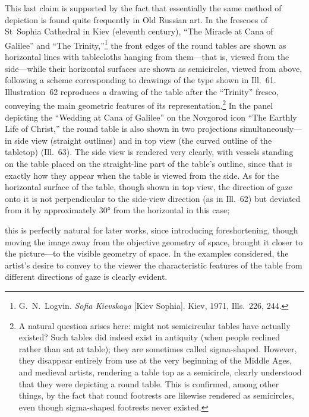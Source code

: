 This last claim is supported by the fact that essentially the same method of depiction
is found quite frequently in Old Russian art.  In the frescoes of St~Sophia Cathedral
in Kiev (eleventh century), ``The Miracle at Cana of Galilee'' and
``The Trinity,''\footnote{G.~N.~Logvin.  \emph{Sofia Kievskaya} [Kiev Sophia].
  Kiev, 1971, Ills.~226, 244.} the front edges of the round tables are shown as
horizontal lines with tablecloths hanging from them---that is, viewed from the side---while
their horizontal surfaces are shown as semicircles, viewed from above, following a scheme
corresponding to drawings of the type shown in Ill.~61.  Illustration~62 reproduces a
drawing of the table after the ``Trinity'' fresco, conveying the main geometric features
of its representation.\footnote{A natural question arises here: might not semicircular
  tables have actually existed?  Such tables did indeed exist in antiquity (when people
  reclined rather than sat at table); they are sometimes called sigma-shaped.  However,
  they disappear entirely from use at the very beginning of the Middle Ages, and medieval
  artists, rendering a table top as a semicircle, clearly understood that they were
  depicting a round table.  This is confirmed, among other things, by the fact that round
  footrests are likewise rendered as semicircles, even though sigma-shaped footrests never
  existed.}  In the panel depicting the ``Wedding at Cana of Galilee'' on the Novgorod
icon ``The Earthly Life of Christ,'' the round table is also shown in two projections
simultaneously---in side view (straight outlines) and in top view (the curved outline of
the tabletop) (Ill.~63).  The side view is rendered very clearly, with vessels standing
on the table placed on the straight-line part of the table's outline, since that is
exactly how they appear when the table is viewed from the side.  As for the horizontal
surface of the table, though shown in top view, the direction of gaze onto it is not
perpendicular to the side-view direction (as in Ill.~62) but deviated from it by
approximately $30°$ from the horizontal in this case;


this is perfectly natural for later works, since introducing foreshortening, though moving
the image away from the objective geometry of space, brought it closer to the picture---to
the visible geometry of space.  In the examples considered, the artist's desire to convey
to the viewer the characteristic features of the table from different directions of gaze
is clearly evident.

